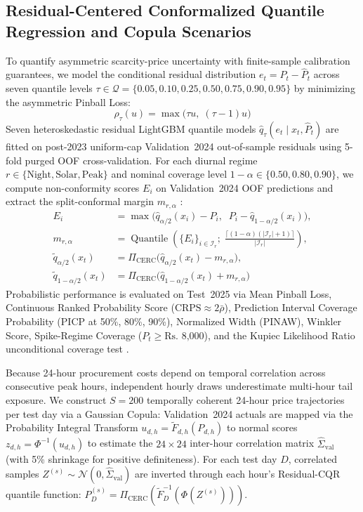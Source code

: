 \documentclass[journal,10pt,twocolumn]{IEEEtran}
\begin{document}
\subsection{Residual-Centered Conformalized Quantile Regression and Copula Scenarios}
To quantify asymmetric scarcity-price uncertainty with finite-sample calibration guarantees, we model the conditional residual distribution $e_t = P_t - \hat{P}_t$ across seven quantile levels $\tau \in \mathcal{Q} = \{0.05, 0.10, 0.25, 0.50, 0.75, 0.90, 0.95\}$ by minimizing the asymmetric Pinball Loss:
\begin{equation}
\rho_\tau(u) = \max\!\big(\tau u, \; (\tau - 1) u\big)
\label{eq:pinball}
\end{equation}
Seven heteroskedastic residual LightGBM quantile models $\hat{q}_\tau(e_t \mid x_t, \hat{P}_t)$ are fitted on post-2023 uniform-cap Validation~2024 out-of-sample residuals using 5-fold purged OOF cross-validation. For each diurnal regime $r \in \{\text{Night}, \text{Solar}, \text{Peak}\}$ and nominal coverage level $1 - \alpha \in \{0.50, 0.80, 0.90\}$, we compute non-conformity scores $E_i$ on Validation~2024 OOF predictions and extract the split-conformal margin $m_{r,\alpha}$ \cite{romano2019conformalized}:
\begin{equation}
\begin{aligned}
E_i &= \max\!\Big(\hat{q}_{\alpha/2}(x_i) - P_i, \;\; P_i - \hat{q}_{1-\alpha/2}(x_i)\Big), \\
m_{r,\alpha} &= \operatorname{Quantile}\!\left(\{E_i\}_{i \in \mathcal{I}_r}; \; \frac{\lceil(1-\alpha)(|\mathcal{I}_r|+1)\rceil}{|\mathcal{I}_r|}\right), \\
\tilde{q}_{\alpha/2}(x_t) &= \Pi_{\text{CERC}}\!\big(\hat{q}_{\alpha/2}(x_t) - m_{r,\alpha}\big), \\
\tilde{q}_{1-\alpha/2}(x_t) &= \Pi_{\text{CERC}}\!\big(\hat{q}_{1-\alpha/2}(x_t) + m_{r,\alpha}\big)
\end{aligned}
\label{eq:cqr_margin}
\end{equation}
Probabilistic performance is evaluated on Test~2025 via Mean Pinball Loss, Continuous Ranked Probability Score ($\text{CRPS} \approx 2\bar{\rho}$), Prediction Interval Coverage Probability (PICP at 50\%, 80\%, 90\%), Normalized Width (PINAW), Winkler Score, Spike-Regime Coverage ($P_t \ge \text{Rs.~8,000}$), and the Kupiec Likelihood Ratio unconditional coverage test \cite{nowotarski2018recent}.

Because 24-hour procurement costs depend on temporal correlation across consecutive peak hours, independent hourly draws underestimate multi-hour tail exposure. We construct $S=200$ temporally coherent 24-hour price trajectories per test day via a Gaussian Copula: Validation~2024 actuals are mapped via the Probability Integral Transform $u_{d,h} = \tilde{F}_{d,h}(P_{d,h})$ to normal scores $z_{d,h} = \Phi^{-1}(u_{d,h})$ to estimate the $24 \times 24$ inter-hour correlation matrix $\hat{\Sigma}_{\text{val}}$ (with 5\% shrinkage for positive definiteness). For each test day $D$, correlated samples $Z^{(s)} \sim \mathcal{N}(0, \hat{\Sigma}_{\text{val}})$ are inverted through each hour's Residual-CQR quantile function: $P_D^{(s)} = \Pi_{\text{CERC}}(\tilde{F}_D^{-1}(\Phi(Z^{(s)})))$.
\end{document}
